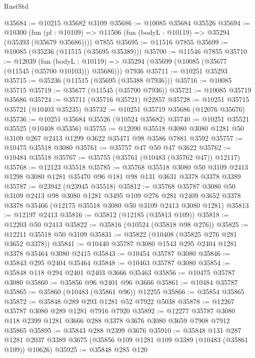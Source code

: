 \begin{lexlean}{RustStd}
\begin{coremodule}
@35684 := @10215 @35682 @3109
@35686 := @10085 @35684 @35526
@35694 := @10300
    (fun (pl : @10109) => @11506 (fun (bodyL : @10119) => @35294 (@35393 (@35679 @35686))))
    @7855
@35695 := @11516 @7855
@35699 := @10085 (@35236 (@11515 (@35695 @35389)))
@35700 := @11546 @7855
@35710 := @12039
    (fun (bodyL : @10119) => @35294 (@35699 (@10085 (@35677 (@11545 (@35700 @10103))) @35686)))
    @7936
@35711 := @10251 @35293
@35715 := @35236 (@11515 (@35695 (@35388 @7936)))
@35716 := @10085 @35715
@35719 := @35677 (@11545 (@35700 @7936))
@35721 := @10085 @35719 @35686
@35724 := @35711 (@35716 @35721) @22857
@35728 := @10251 @35715 @35721 (@10403 @35235)
@35732 := @10251 @35719 @35686 (@12076 @35676)
@35736 := @10251 @35684 @35526 (@10524 @35682)
@35740 := @10251 @35521 @35525 (@10408 @35356)
@35755 := @12090
    @35518
    @3080
    @3080
    @1281
    @50
    @3109
    @267
    @2413
    @1299
    @3622
    @35471
    @98
    @3586
    @7881
    @3592
@35757 := @10475 @35518 @3080
@35761 := @35757 @47 @50 @47 @3622
@35762 := @10484 @35518
@35767 := @35755 (@35761 (@10483 (@35762 @47)) @12117)
@35768 := @12123 @35518
@35785 := @35768
    @35518
    @3080
    @50
    @3109
    @2413
    @1298
    @3080
    @1281
    @35470
    @96
    @181
    @98
    @131
    @3631
    @3378
    @3378
    @3389
@35787 := @23942 (@23945 @35518)
@35812 := @35768
    @35787
    @3080
    @50
    @3109
    @2413
    @98
    @3080
    @1281
    @3495
    @109
    @276
    @281
    @2409
    @3652
    @3378
    @3378
    @35466
    (@12175 @35518 @3080 @50 @3109 @2413 @3080 @1281)
@35813 := @12197 @2413
@35816 := @35812 (@12185 (@35813 @109))
@35818 := @12203 @50 @2413
@35822 := @35816 (@10524 (@35818 @98 @276))
@35825 := @12211 @35518 @50 @3109
@35831 := @35822 (@10408 (@35825 @276 @281 @3652 @3378))
@35841 := @10440 @35787 @3080 @1543 @295 @2404 @1281 @3378 @35464 @3080 @2415
@35843 := @10454 @35787 @3080
@35846 := @35843 @295 @2404 @35464
@35848 := @10463 @35787 @3080
@35854 := @35848 @118 @294 @2401 @2403 @3666 @35463
@35856 := @10475 @35787 @3080
@35860 := @35856 @96 @2401 @96 @3666
@35861 := @10484 @35787
@35865 := @35860 (@10483 (@35861 @96)) @12255
@35866 := @35854 @35865
@35872 := @35848 @289 @293 @1281 @52 @7922 @5038
@35878 := @12267 @35787 @3080 @289 @1281 @7916 @7920
@35892 := @12277 @35787 @3080 @118 @2399 @1281 @3666 @288 @3378 @3676 @3080 @3659 @7908 @7912 @35865
@35895 := @35843 @288 @2399 @3676
@35910 := @35848
    @131
    @287
    @1281
    @2037
    @3389
    @3675
    (@35856 @109 @1281 @109 @3389 (@10483 (@35861 @109)) @10626)
@35925 := @35848
    @285
    @120

\end{coremodule}
\end{lexlean}
